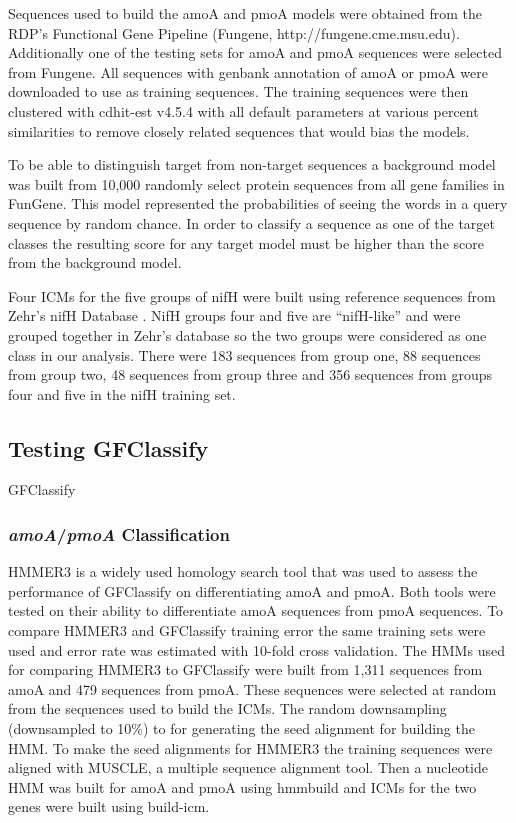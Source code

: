 \documentclass{article}
\begin{document}
Sequences used to build the amoA and pmoA models were obtained from the RDP's Functional Gene Pipeline (Fungene, http://fungene.cme.msu.edu).  Additionally one of the testing sets for amoA and pmoA sequences were selected from Fungene.  All sequences with genbank annotation of amoA or pmoA were downloaded to use as training sequences.  The training sequences were then clustered with cdhit-est v4.5.4 with all default parameters at various percent similarities \cite{cdhit} to remove closely related sequences that would bias the models.

To be able to distinguish target from non-target sequences a background model was built from 10,000 randomly select protein sequences from all gene families in FunGene.  This model represented the probabilities of seeing the words in a query sequence by random chance.  In order to classify a sequence as one of the target classes the resulting score for any target model must be higher than the score from the background model.

Four ICMs for the five groups of nifH were built using reference sequences from Zehr's nifH Database \cite{ZehrNifh}.  NifH groups four and five are ``nifH-like'' and were grouped together in Zehr's database so the two groups were considered as one class in our analysis.  There were 183 sequences from group one, 88 sequences from group two, 48 sequences from group three and 356 sequences from groups four and five in the nifH training set.

\subsection{Testing GFClassify}

GFClassify

\subsubsection{\emph{amoA}/\emph{pmoA} Classification}
HMMER3 is a widely used homology search tool that was used to assess the performance of GFClassify on differentiating amoA and pmoA.  Both tools were tested on their ability to differentiate amoA sequences from pmoA sequences.  To compare HMMER3 and GFClassify training error the same training sets were used and error rate was estimated with 10-fold cross validation.  The HMMs used for comparing HMMER3 to GFClassify were built from 1,311 sequences from amoA and 479 sequences from pmoA.  These sequences were selected at random from the sequences used to build the ICMs.  The random downsampling (downsampled to 10\%) to for generating the seed alignment for building the HMM.  To make the seed alignments for HMMER3 the training sequences were aligned with MUSCLE\cite{muscle}, a multiple sequence alignment tool.  Then a nucleotide HMM was built for amoA and pmoA using hmmbuild and ICMs for the two genes were built using build-icm.
\end{document}
